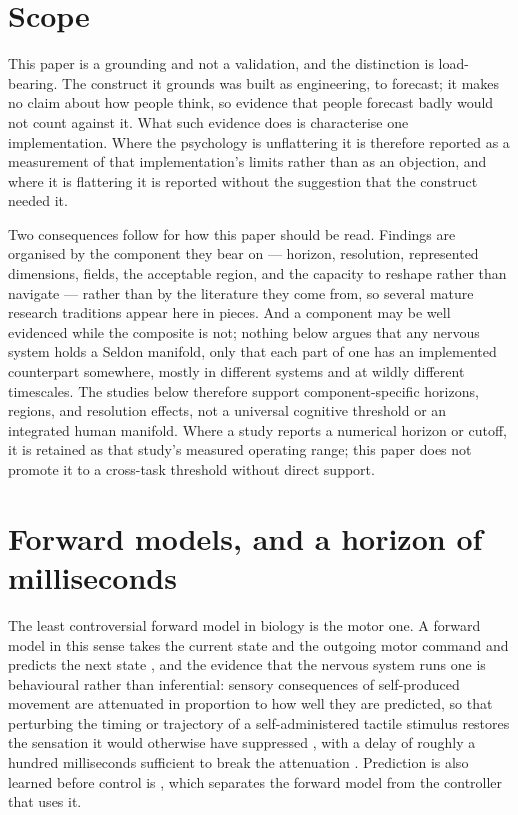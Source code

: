 \documentclass[11pt,a4paper]{article}
\theoremstyle{remark}
\begin{document}
\section{Scope}\label{sec:scope}
This paper is a grounding and not a validation, and the distinction is load-bearing. The construct
it grounds was built as engineering, to forecast; it makes no claim about how people think, so
evidence that people forecast badly would not count against it. What such evidence does is
characterise one implementation. Where the psychology is unflattering it is therefore reported as a
measurement of that implementation's limits rather than as an objection, and where it is
flattering it is reported without the suggestion that the construct needed it.

Two consequences follow for how this paper should be read. Findings are organised by the component
they bear on --- horizon, resolution, represented dimensions, fields, the acceptable region, and the
capacity to reshape rather than navigate --- rather than by the literature they come from, so several
mature research traditions appear here in pieces. And a component may be well evidenced while the
composite is not; nothing below argues that any nervous system holds a Seldon manifold, only that
each part of one has an implemented counterpart somewhere, mostly in different systems and at wildly
different timescales. The studies below therefore support component-specific horizons, regions, and
resolution effects, not a universal cognitive threshold or an integrated human manifold. Where a study
reports a numerical horizon or cutoff, it is retained as that study's measured operating range; this
paper does not promote it to a cross-task threshold without direct support.

\section{Forward models, and a horizon of milliseconds}\label{sec:motor}
The least controversial forward model in biology is the motor one. A forward model in this sense
takes the current state and the outgoing motor command and predicts the next state
\citep{miallwolpert1996}, and the evidence that the nervous system runs one is behavioural rather
than inferential: sensory consequences of self-produced movement are attenuated in proportion to
how well they are predicted, so that perturbing the timing or trajectory of a self-administered
tactile stimulus restores the sensation it would otherwise have suppressed
\citep{blakemore1999}, with a delay of roughly a hundred milliseconds sufficient to break the
attenuation \citep{kilteni2019}. Prediction is also learned before control is
\citep{flanagan2003}, which separates the forward model from the controller that uses it.
\end{document}
